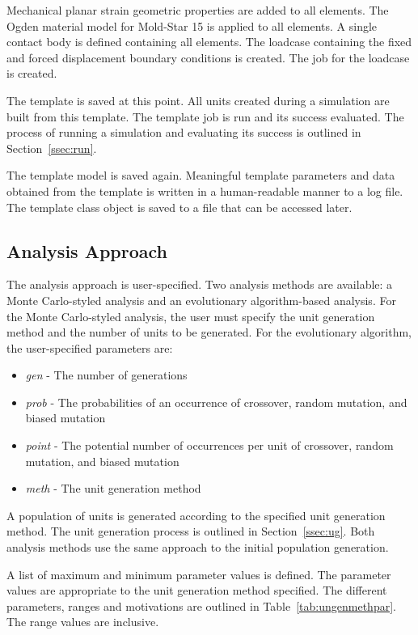 Mechanical planar strain geometric properties are added to all elements. The Ogden material model for Mold-Star 15 is applied to all elements. A single contact body is defined containing all elements. The loadcase containing the fixed and forced displacement boundary conditions is created. The job for the loadcase is created.

The template is saved at this point. All units created during a simulation are built from this template. The template job is run and its success evaluated. The process of running a simulation and evaluating its success is outlined in Section~\ref{ssec:run}.

The template model is saved again. Meaningful template parameters and data obtained from the template is written in a human-readable manner to a log file. The template class object is saved to a file that can be accessed later.

\subsection{Analysis Approach}

The analysis approach is user-specified. Two analysis methods are available: a Monte Carlo-styled analysis and an evolutionary algorithm-based analysis. For the Monte Carlo-styled analysis, the user must specify the unit generation method and the number of units to be generated. For the evolutionary algorithm, the user-specified parameters are:

\begin{itemize}
	\item \textit{gen} - The number of generations
	\item \textit{prob} - The probabilities of an occurrence of crossover, random mutation, and biased mutation
	\item \textit{point} - The potential number of occurrences per unit of crossover, random mutation, and biased mutation
	\item \textit{meth} - The unit generation method
\end{itemize}

A population of units is generated according to the specified unit generation method. The unit generation process is outlined in Section~\ref{ssec:ug}. Both analysis methods use the same approach to the initial population generation.

A list of maximum and minimum parameter values is defined. The parameter values are appropriate to the unit generation method specified. The different parameters, ranges and motivations are outlined in Table~\ref{tab:ungenmethpar}. The range values are inclusive.

